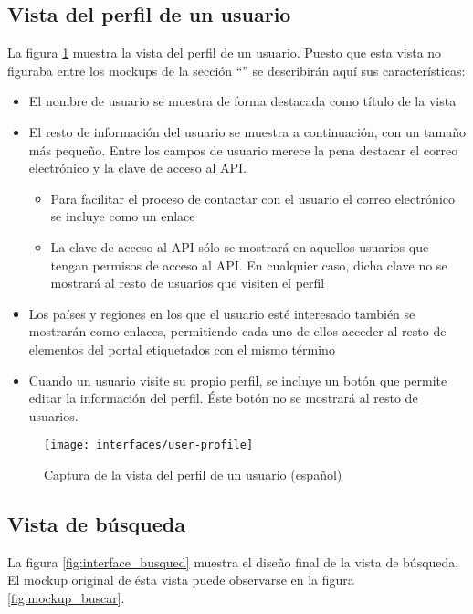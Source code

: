 \subsection{Vista del perfil de un usuario}
La figura \ref{fig:interface_perfil_usuario} muestra la vista del perfil de un usuario.  Puesto que esta vista no figuraba entre los mockups de la sección ``'' se describirán aquí sus características:
\begin{itemize}
	\item El nombre de usuario se muestra de forma destacada como título de la vista
	\item El resto de información del usuario se muestra a continuación, con un tamaño más pequeño.  Entre los campos de usuario merece la pena destacar el correo electrónico y la clave de acceso al API.
	\begin{itemize}
		\item Para facilitar el proceso de contactar con el usuario el correo electrónico se incluye como un enlace
		\item La clave de acceso al API sólo se mostrará en aquellos usuarios que tengan permisos de acceso al API.  En cualquier caso, dicha clave no se mostrará al resto de usuarios que visiten el perfil
	\end{itemize}
	\item Los países y regiones en los que el usuario esté interesado también se mostrarán como enlaces, permitiendo cada uno de ellos acceder al resto de elementos del portal etiquetados con el mismo término
	\item Cuando un usuario visite su propio perfil, se incluye un botón que permite editar la información del perfil.  Éste botón no se mostrará al resto de usuarios.
\end{itemize}
\begin{figure}[h]
	\centering
	\texttt{[image: interfaces/user-profile]}
	\caption{Captura de la vista del perfil de un usuario (español)}
	\label{fig:interface_perfil_usuario}
\end{figure}


\subsection{Vista de búsqueda}
La figura \ref{fig:interface_busqued} muestra el diseño final de la vista de búsqueda.  El mockup original de ésta vista puede observarse en la figura \ref{fig:mockup_buscar}.


